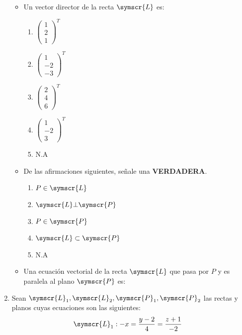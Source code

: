 \documentclass{article}
\def\fancyL{\symscr{L}}
\def\fancyP{\symscr{P}}
\begin{document}
\begin{enumerate}
        \begin{itemize}
            \item Un vector director de la recta \(\fancyL\) es:
                \begin{enumerate}[label=\listAlph]
                    \item \(\begin{pmatrix}1 \\ 2 \\ 1\end{pmatrix}^T\)
					\item \(\begin{pmatrix}1 \\ -2 \\ -3\end{pmatrix}^T\)
					\item \(\begin{pmatrix}2 \\ 4 \\ 6\end{pmatrix}^T\)
					\item \(\begin{pmatrix}1 \\ -2 \\ 3\end{pmatrix}^T\)
					\item N.A
                \end{enumerate}
            \item De las afirmaciones siguientes, señale una \textbf{VERDADERA}.
                \begin{enumerate}
                    \item \(P \in \fancyL\)
                    \item \(\fancyL \bot \fancyP\)
                    \item \(P \in \fancyP\)
                    \item \(\fancyL \subset \fancyP\)
                    \item N.A
                \end{enumerate}
            \item Una ecuación vectorial de la recta \(\fancyL\) que pasa por \(P\) y es paralela al plano \(\fancyP\) es:
        \end{itemize}
\setcounter{enumi}{20}
\item Sean \(\fancyL_1, \fancyL_2, \fancyP_1, \fancyP_2\) las rectas y planos cuyas ecuaciones son las siguientes:
    \[
        \begin{aligned}
            \fancyL_1 &: -x = \frac{y - 2}{4} = \frac{z + 1}{-2}

\end{aligned}\]
\end{enumerate}
\end{document}

